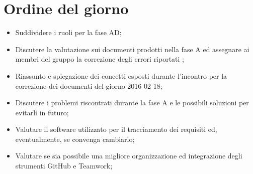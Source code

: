 \documentclass[../RiunioneInterna16-02-19.tex]{subfiles}
\begin{document}
\section{Ordine del giorno}
\begin{itemize}
	\item Suddividere i ruoli per la fase AD;
	\item Discutere la valutazione sui documenti prodotti nella fase A ed assegnare ai membri del gruppo la correzione degli errori riportati ;
	\item Riassunto e spiegazione dei concetti esposti durante l'incontro per la correzione dei documenti del giorno 2016-02-18;
	\item Discutere i problemi riscontrati durante la fase A e le possibili soluzioni per evitarli in futuro;
	\item Valutare il software utilizzato per il tracciamento dei requisiti ed, eventualmente, se convenga cambiarlo;
	\item Valutare se sia possibile una migliore organizzazione ed integrazione degli strumenti GitHub e Teamwork;
\end{itemize}
\end{document}
